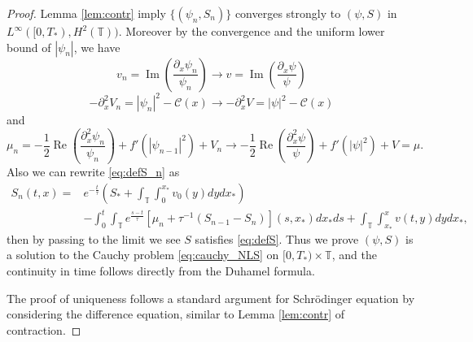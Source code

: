 \documentclass[10pt,a4paper]{amsart}
\DeclareMathOperator{\IM}{Im}
\DeclareMathOperator{\RE}{Re}
\def\T{{\mathbb T}}%
\def\d{{\partial}}
\begin{document}
\begin{proof}
Lemma \ref{lem:contr} imply $\{(\psi_n,S_n)\}$ converges strongly to $(\psi,S)$ in $L^\infty([0,T_*),H^2(\T))$. Moreover by the convergence and the uniform lower bound of $|\psi_n|$, we have
\[
v_n=\IM\left(\frac{\d_x\psi_n}{\psi_n}\right)\to v=\IM\left(\frac{\d_x\psi}{\psi}\right)
\]
\[
-\d_x^2 V_n=|\psi_n|^2-\mathcal{C}(x)\to-\d_x^2 V=|\psi|^2-\mathcal{C}(x)
\]
and
\[
\mu_n=-\frac12\RE\left(\frac{\d_x^2\psi_n}{\psi_n}\right)+f'(|\psi_{n-1}|^2)+V_n\to -\frac12\RE\left(\frac{\d_x^2\psi}{\psi}\right)+f'(|\psi|^2)+V=\mu.
\] 
Also we can rewrite \eqref{eq:defS_n} as
\begin{align*}
S_n(t,x)=&e^{-\frac{t}{\tau}}\left(S_*+\int_\T\int_0^{x_*}v_0(y)dydx_*\right)\\
&-\int_0^t \int_\T e^{\frac{s-t}{\tau}}[\mu_n+\tau^{-1}(S_{n-1}-S_n)](s,x_*)dx_*ds+\int_\T\int_{x_*}^x v(t,y)dydx_*,
\end{align*}
then by passing to the limit we see $S$ satisfies \eqref{eq:defS}. Thus we prove $(\psi,S)$ is a solution to the Cauchy problem \eqref{eq:cauchy_NLS} on $[0,T_*)\times\T$, and the continuity in time follows directly from the Duhamel formula.

The proof of uniqueness follows a standard argument for Schr\"odinger equation by considering the difference equation, similar to Lemma \ref{lem:contr} of contraction.
\end{proof}
\end{document}
